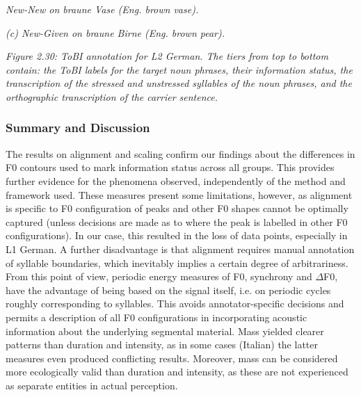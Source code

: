 \begin{listWWNumxileveli}
\item 
\begin{styleListParagraph}
\textit{New-New on braune Vase (Eng. brown vase).}
\end{styleListParagraph}
\end{listWWNumxileveli}
\begin{styleStandard}
  [Warning: Image ignored] %
 
\end{styleStandard}

\begin{styleStandard}
\textit{(c) New-Given on braune Birne (Eng. brown pear).}
\end{styleStandard}

\begin{stylelsTable}
\textit{Figure 2.30: ToBI annotation for L2 German. The tiers from top to bottom contain: the ToBI labels for the target noun phrases, their information status, the transcription of the stressed and unstressed syllables of the noun phrases, and the orthographic transcription of the carrier sentence.}
\end{stylelsTable}

\subsubsection{}
\subsubsection{Summary and Discussion}
\hypertarget{Toc191305921}{}\begin{stylelsBulletList}
The results on alignment and scaling confirm our findings about the differences in F0 contours used to mark information status across all groups. This provides further evidence for the phenomena observed, independently of the method and framework used. These measures present some limitations, however, as alignment is specific to F0 configuration of peaks and other F0 shapes cannot be optimally captured (unless decisions are made as to where the peak is labelled in other F0 configurations). In our case, this resulted in the loss of data points, especially in L1 German. A further disadvantage is that alignment requires manual annotation of syllable boundaries, which inevitably implies a certain degree of arbitrariness. From this point of view, periodic energy measures of F0, synchrony and ${\Delta}$F0, have the advantage of being based on the signal itself, i.e. on periodic cycles roughly corresponding to syllables. This avoids annotator-specific decisions and permits a description of all F0 configurations in incorporating acoustic information about the underlying segmental material. Mass yielded clearer patterns than duration and intensity, as in some cases (Italian) the latter measures even produced conflicting results. Moreover, mass can be considered more ecologically valid than duration and intensity, as these are not experienced as separate entities in actual perception.
\end{stylelsBulletList}

